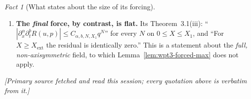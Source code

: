 \documentclass[11pt]{article}
\theoremstyle{definition}
\theoremstyle{remark}
\newtheorem{fact}[theorem]{Fact}
\newcommand{\abs}[1]{\left|#1\right|}
\begin{document}
\begin{fact}[What \cite{OpenAI2026} states about the size of its forcing]
\begin{enumerate}[label=(\roman*),leftmargin=2.6em]
      $\abs{\partial^\alpha E_B}\leq C_{\alpha,M}q^M$ for every $M$, and its
      (5.43) fixes $\widehat T=q^{A+1/2}T_{\mathrm{phys}}$ with
      $\abs{D^I(\widehat T-T_0)}\leq C_Iq^{2h}\zeta\delta^{-N_I}$.
    \item \textbf{The \emph{final} force, by contrast, is flat.} Its
      Theorem~3.1(iii):
      ``$\abs{\partial_x^\alpha\partial_t^bR(u,p)}
         \leq C_{\alpha,b,N,X_1}q^N$'' for every $N$ on $0\leq X\leq X_1$,
      and ``For $X\geq X_{\mathrm{ext}}$ the residual is identically zero.''
      This is a statement about the \emph{full, non-axisymmetric} field, to
      which Lemma~\ref{lem:wpt3-forced-max} does not apply.
  \end{enumerate}
  \emph{[Primary source fetched and read this session; every quotation above
  is verbatim from it.]}
\end{fact}
\end{document}
